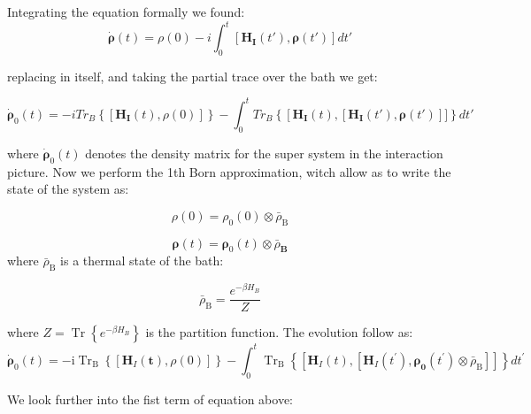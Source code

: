 \documentclass[%
preprint,
onecolumn,
notitlepag,
 amsmath,amssymb,
 aps,
 pra,
]{revtex4-2}
\begin{document}
Integrating the equation formally we found:
\begin{equation}
 \dot{\boldsymbol{\rho}}(t)= \rho(0)  -i \int_0^t \left[  \mathbf{H_I}(t') ,  \boldsymbol{\rho}(t')\right] dt' 
 \label{1 integral}
\end{equation}



replacing in itself, and taking the partial trace over the bath we get:

\begin{equation}
      \dot{\boldsymbol{\rho}}_0(t) = -i Tr_B \left \lbrace \left[  \mathbf{H_I}(t) ,  \rho(0)\right] \right \rbrace - \int_0 ^t Tr_B \left \lbrace   \left[  \mathbf{H_I}(t) ,  \left[  \mathbf{H_I}(t') ,  \boldsymbol{\rho}(t')\right]]  \right \rbrace dt' 
\end{equation}

where  $\dot{\boldsymbol{\rho}}_0(t)$ denotes the density matrix for the  super system in the interaction picture.  Now we perform the 1th Born approximation, witch allow as to write the state of the system as: 

\begin{equation}
\rho(0)=\rho_{\mathrm{0}} (0) \otimes \bar{\rho}_{\mathrm{B}}
\end{equation}


\begin{equation}
\boldsymbol{\rho}(t)=\boldsymbol{\rho}_0(t) \otimes \bar{\rho}_{\mathbf{B}}
\end{equation}
where  $\bar{\rho}_{\mathrm{B}}$ is a thermal state of the bath:

\begin{equation}
   \bar{\rho}_{\mathrm{B}}= \frac{e^{- \beta H_B}}{Z}
\end{equation}

where $Z= \operatorname{Tr} \left\{ e^{- \beta H_B} \right\}$ is the partition function. The evolution follow as:
\begin{equation}
 \dot{\boldsymbol{\rho}}_0(t)=-\mathrm{i} \operatorname{Tr}_{\mathrm{B}}\left\{\left[\boldsymbol{H}_{I}(\boldsymbol{t}), \rho(0)\right]\right\}-\int_{0}^{t} \operatorname{Tr}_{\mathrm{B}}\left\{\left[\boldsymbol{H}_{I}(t),\left[\boldsymbol{H}_{I}\left(t^{\prime}\right),\boldsymbol{ \rho_{0}} \left(t^{\prime}\right) \otimes \bar{\rho}_{\mathrm{B}}\right]\right]\right\} d t^{\prime}
\end{equation}


We look further into the fist term of equation above:
\end{document}
